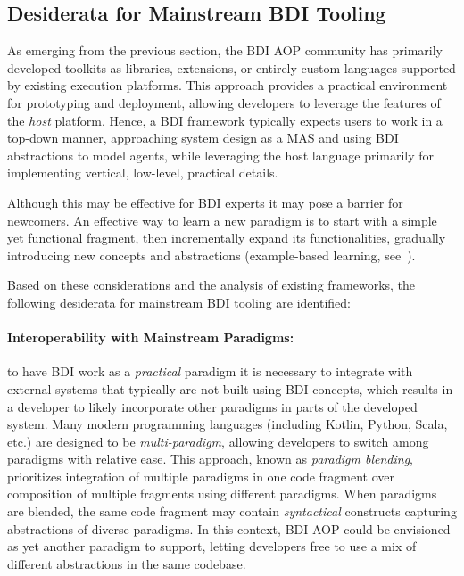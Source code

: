 \subsection{Desiderata for Mainstream \acs{BDI} Tooling}

As emerging from the previous section,
the \ac{BDI} \ac{AOP} community has primarily developed toolkits
as libraries, extensions, or entirely custom languages
supported by existing execution platforms.
%
This approach provides a practical environment for prototyping and deployment,
allowing developers to leverage the features of the \emph{host} platform.
%
Hence,
a \ac{BDI} framework typically expects users to work in a top-down manner,
approaching system design as a \ac{MAS} and using \ac{BDI} abstractions to model agents,
while leveraging the host language primarily for implementing vertical, low-level, practical details.

Although this may be effective for \ac{BDI} experts
it may pose a barrier for newcomers.
%
An effective way to learn a new paradigm is to start with a simple yet functional fragment,
then incrementally expand its functionalities,
gradually introducing new concepts and abstractions (example-based learning, see~\cite{vanGog2010}).
%

Based on these considerations and the analysis of existing frameworks, the following desiderata for mainstream \ac{BDI} tooling are identified:

\paragraph{Interoperability with Mainstream Paradigms:} to have \ac{BDI} work as a \emph{practical} paradigm it is necessary to integrate with external systems that typically are not built using \ac{BDI} concepts, which results in a developer to likely incorporate other paradigms in parts of the developed system.
%
Many modern programming languages (including Kotlin, Python, Scala, etc.) are designed to be \emph{multi-paradigm}, allowing developers to switch among paradigms with relative ease.
%
This approach, known as \emph{paradigm blending},
prioritizes integration of multiple paradigms in one code fragment
over composition of multiple fragments using different paradigms.
%
When paradigms are blended,
the same code fragment may contain \emph{syntactical}
constructs capturing abstractions of diverse paradigms.
%
In this context, \ac{BDI} \ac{AOP} could be envisioned
as yet another paradigm to support,
letting developers free to use a mix of different abstractions in the same codebase.



